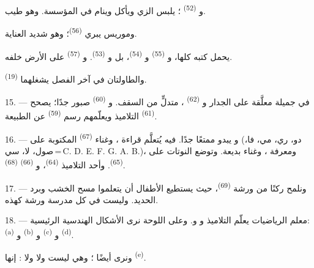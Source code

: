 و \textsuperscript{(52)} ؛ يلبس الزي ويأكل
وينام في المؤسسة. وهو  طيب.

وموريس يبري   \textsuperscript{(56)}؛ وهو
شديد العناية.

يحمل كتبه كلها، و \textsuperscript{(55)} و
\textsuperscript{(54)}، بل و \textsuperscript{(53)}. و
\textsuperscript{(57)} على الأرض خلفه.

والطاولتان في آخر الفصل يشغلهما  \textsuperscript{(19)}.

\VUsaut{4.6mm}
\VUsaut{3.4mm}

15. --- في   جميلة معلَّقة على الجدار
و \textsuperscript{(62)} ، متدلٍّ من السقف.
و \textsuperscript{(60)} صبور جدًا؛ يصحح 
\textsuperscript{(61)} التلاميذ ويعلّمهم رسم  \textsuperscript{(59)}
عن الطبيعة.

16. --- و يبدو ممتعًا جدًا. فيه يُتعلَّم قراءة
، وغناء  \textsuperscript{(67)} المكتوبة على
 (دو، ري، مي، فا، صول، لا، سي\,=\,C. D. E. F. G. A. B.)،
ومعرفة ، وغناء  بديعة. وتوضع النوتات على
 \textsuperscript{(65)}. وأحد التلاميذ 
\textsuperscript{(64)}، و \textsuperscript{(66)}
 \textsuperscript{(68)}.

17. --- ونلمح ركنًا من ورشة  \textsuperscript{(69)}،
حيث يستطيع الأطفال أن يتعلموا مسح الخشب وبرد الحديد. وليست في كل مدرسة
ورشة كهذه.

\VUsaut{5.0mm}
\VUsaut{3.6mm}

18. --- معلم الرياضيات يعلّم التلاميذ 
و و. وعلى اللوحة نرى الأشكال
الهندسية الرئيسية:  \textsuperscript{(a)} و
\textsuperscript{(b)} و \textsuperscript{(c)} و
\textsuperscript{(d)}.

ونرى أيضًا ؛ وهي ليست  ولا  ولا
: إنها  \textsuperscript{(e)}.

